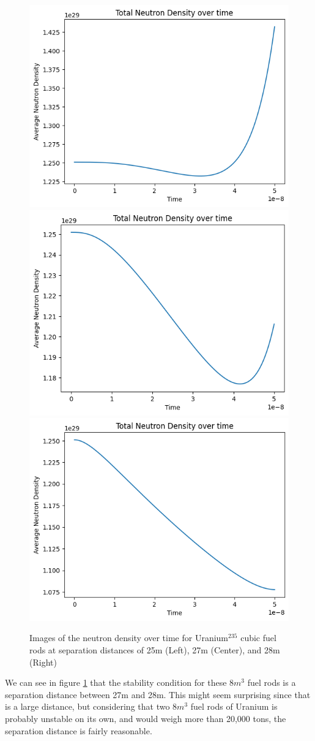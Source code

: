 \documentclass[letterpaper, 12pt]{article}
\begin{document}
         \begin{figure}[h!]
            \centering
            \includegraphics[width=0.3\linewidth]{Graphs/Criticality-Test-U235-25m.png}
            \includegraphics[width=0.3\linewidth]{Graphs/Criticality-Test-U235-27m.png}
            \includegraphics[width=0.3\linewidth]{Graphs/Criticality-Test-U235-28m.png}
            \caption{Images of the neutron density over time for Uranium$^{235}$ cubic fuel rods at separation distances of 25m (Left), 27m (Center), and 28m (Right)}
            \label{img:Uranium-Criticality-Test}
         \end{figure}

         We can see in figure \ref{img:Uranium-Criticality-Test} that the stability condition for these $8m^3$ fuel rods is a separation distance between 27m and 28m. This might seem surprising since that is a large distance, but considering that two $8m^3$ fuel rods of Uranium is probably unstable on its own, and would weigh more than 20,000 tons, the separation distance is fairly reasonable.\\
\end{document}
